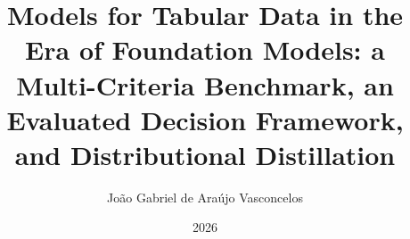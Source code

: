 \documentclass[en,oneside,onehalfspacing,msc]{risethesis}
\title{Models for Tabular Data in the Era of Foundation Models:
a Multi-Criteria Benchmark, an Evaluated Decision Framework, and
Distributional Distillation}
\date{2026}
\author{João Gabriel de Araújo Vasconcelos}
\begin{document}
\frontpage
\presentationpage

\begin{fichacatalografica}
\end{fichacatalografica}


\acknowledgements


\abstract


\resumo




\listoffigures
\listoftables

\tableofcontents
\clearpage
\pagestyle{fancy}










\cleardoublepage
{}



\theappendix



\end{document}
